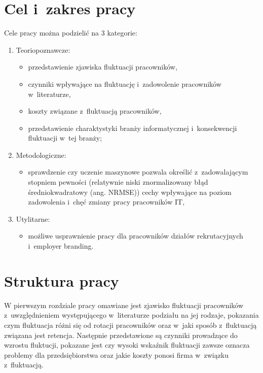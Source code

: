 \section*{Cel i~zakres pracy}\label{sec:admission:thesis-goal}

Cele pracy można podzielić na 3 kategorie:
\begin{enumerate}
    \item Teoriopoznawcze:
    \begin{itemize}
        \item przedstawienie zjawiska fluktuacji pracowników,
        \item czynniki wpływające na fluktuację i~zadowolenie pracowników w~literaturze,
        \item koszty związane z~fluktuacją pracowników,
        \item przedstawienie charaktystyki branży informatycznej i~konsekwencji fluktuacji w~tej branży;
    \end{itemize}
    \item Metodologiczne:
    \begin{itemize}
        \item sprawdzenie czy uczenie maszynowe pozwala określić z~zadowalającym stopniem pewności (relatywnie niski znormalizowany błąd średniokwadratowy (ang. NRMSE)) cechy wpływające na poziom zadowolenia i~chęć zmiany pracy pracowników IT,
    \end{itemize}
    \pagebreak %
    \item Utylitarne:
    \begin{itemize}
        \item możliwe usprawnienie pracy dla pracowników działów rekrutacyjnych i~employer branding.
    \end{itemize}
\end{enumerate}

\section*{Struktura pracy}\label{sec:admission:thesis-structure}

W pierwszym rozdziale pracy omawiane jest zjawisko fluktuacji pracowników z~uwzględnieniem występującego w~literaturze podziału na jej rodzaje,
pokazania czym fluktuacja różni się od rotacji pracowników oraz w~jaki sposób z~fluktuacją związana jest retencja.
Następnie przedstawione są czynniki prowadzące do wzrostu fluktucji, pokazane jest czy wysoki wskaźnik fluktuacji zawsze oznacza problemy dla przedsiębiorstwa
oraz jakie koszty ponosi firma w~związku z~fluktuacją.

